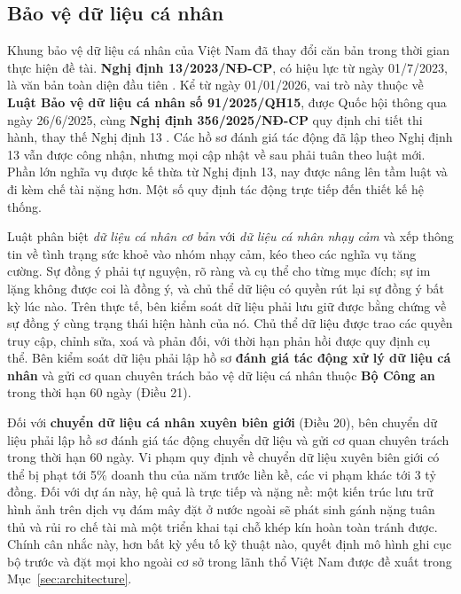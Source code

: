 \subsection{Bảo vệ dữ liệu cá nhân}

Khung bảo vệ dữ liệu cá nhân của Việt Nam đã thay đổi căn bản trong thời gian
thực hiện đề tài. \textbf{Nghị định 13/2023/NĐ-CP}, có hiệu lực từ ngày 01/7/2023,
là văn bản toàn diện đầu tiên \cite{decree13}. Kể từ ngày 01/01/2026, vai trò này
thuộc về \textbf{Luật Bảo vệ dữ liệu cá nhân số 91/2025/QH15}, được Quốc hội thông
qua ngày 26/6/2025, cùng \textbf{Nghị định 356/2025/NĐ-CP} quy định chi tiết thi
hành, thay thế Nghị định 13 \cite{pdpl2025,decree356}. Các hồ sơ đánh giá tác động
đã lập theo Nghị định 13 vẫn được công nhận, nhưng mọi cập nhật về sau phải tuân
theo luật mới. Phần lớn nghĩa vụ được kế thừa từ Nghị định 13, nay được nâng lên
tầm luật và đi kèm chế tài nặng hơn. Một số quy định tác động trực tiếp đến thiết
kế hệ thống.

Luật phân biệt \emph{dữ liệu cá nhân cơ bản} với \emph{dữ liệu cá nhân nhạy cảm}
và xếp thông tin về tình trạng sức khoẻ vào nhóm nhạy cảm, kéo theo các nghĩa vụ
tăng cường. Sự đồng ý phải tự nguyện, rõ ràng và cụ thể cho từng mục đích; sự im
lặng không được coi là đồng ý, và chủ thể dữ liệu có quyền rút lại sự đồng ý bất
kỳ lúc nào. Trên thực tế, bên kiểm soát dữ liệu phải lưu giữ được bằng chứng về sự
đồng ý cùng trạng thái hiện hành của nó. Chủ thể dữ liệu được trao các quyền truy
cập, chỉnh sửa, xoá và phản đối, với thời hạn phản hồi được quy định cụ thể. Bên
kiểm soát dữ liệu phải lập hồ sơ \textbf{đánh giá tác động xử lý dữ liệu cá nhân}
và gửi cơ quan chuyên trách bảo vệ dữ liệu cá nhân thuộc \textbf{Bộ Công an} trong
thời hạn 60 ngày (Điều 21).

Đối với \textbf{chuyển dữ liệu cá nhân xuyên biên giới} (Điều 20), bên chuyển dữ
liệu phải lập hồ sơ đánh giá tác động chuyển dữ liệu và gửi cơ quan chuyên trách
trong thời hạn 60 ngày. Vi phạm quy định về chuyển dữ liệu xuyên biên giới có thể
bị phạt tới 5\% doanh thu của năm trước liền kề, các vi phạm khác tới 3 tỷ đồng.
Đối với dự án này, hệ quả là trực tiếp và nặng nề: một kiến trúc lưu trữ hình ảnh
trên dịch vụ đám mây đặt ở nước ngoài sẽ phát sinh gánh nặng tuân thủ và rủi ro chế
tài mà một triển khai tại chỗ khép kín hoàn toàn tránh được. Chính cân nhắc này, hơn
bất kỳ yếu tố kỹ thuật nào, quyết định mô hình ghi cục bộ trước và đặt mọi kho ngoài
cơ sở trong lãnh thổ Việt Nam được đề xuất trong Mục~\ref{sec:architecture}.

